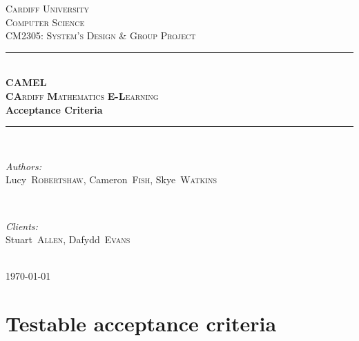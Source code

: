 \documentclass[12pt]{article}
\begin{document}
	\begin{titlepage}
		\newcommand{\HRule}{\rule{\linewidth}{0.5mm}}

		\center

		\textsc{\LARGE Cardiff University}\\[1.5cm]
		\textsc{\Large Computer Science}\\[0.5cm]
		\textsc{\large CM2305: System's Design \& Group Project}\\[0.5cm]

		\HRule \\[0.4cm]
		\textsc{\Large \textbf{CAMEL}}\\[0.1cm]
		\textsc{\Large \textbf{CA}rdiff \textbf{M}athematics \textbf{E-L}earning}\\[0.7cm]
		{\huge\bfseries Acceptance Criteria}\\[0.4cm]
		\HRule \\[1.5cm]

		\begin{minipage}{0.4\textwidth}
			\begin{flushleft} \large
				\emph{Authors:}\\
				\mbox{Lucy \textsc{Robertshaw}}, \mbox{Cameron \textsc{Fish}}, \mbox{Skye \textsc{Watkins}}
			\end{flushleft}
		\end{minipage}
		~
		\begin{minipage}{0.4\textwidth}
			\begin{flushright} \large
				\emph{Clients:} \\
				\mbox{Stuart \textsc{Allen}}, \mbox{Dafydd \textsc{Evans}}
			\end{flushright}
		\end{minipage}\\[3cm]

		{\large \today}\\[2cm]

		\vfill
	\end{titlepage}


	\tableofcontents

	\newpage
	
	\section{Testable acceptance criteria}
	
	    \medskip
	    
\end{document}
